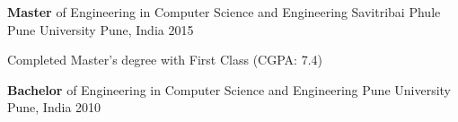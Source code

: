 

\begin{cventries}

  \cventry
    {\textbf{Master} of Engineering in Computer Science and Engineering} %
    {Savitribai Phule Pune University} %
    {Pune, India} %
    {2015} %
    {
      \begin{cvitems} %
		    \item {Completed Master's degree with First Class (CGPA: 7.4)}
      \end{cvitems}
    }
	\cventry
    {\textbf{Bachelor} of Engineering in Computer Science and Engineering} %
    {Pune University} %
    {Pune, India} %
    {2010} %
    {}
\end{cventries}
